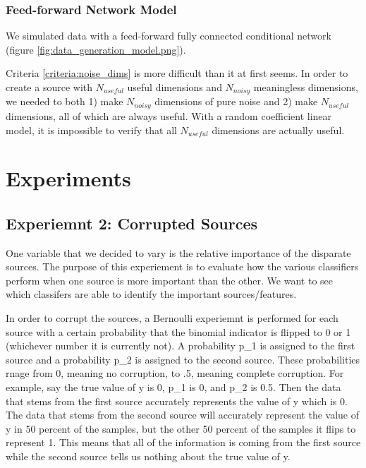 \documentclass{article}
\begin{document}
\subsubsection{Feed-forward Network Model}

We simulated data with a feed-forward fully connected conditional network
(figure \ref{fig:data_generation_model.png}).


Criteria \ref{criteria:noise_dims} is more difficult than it at first seems. In
order to create a source with $N_{useful}$ useful dimensions and $N_{noisy}$
meaningless dimensions, we needed to both 1) make $N_{noisy}$ dimensions of pure
noise and 2) make $N_{useful}$ dimensions, all of which are always useful. With a
random coefficient linear model, it is impossible to verify that all $N_{useful}$
dimensions are actually useful.


\section{Experiments}









\subsection{Experiemnt 2: Corrupted Sources}

One variable that we decided to vary is the relative importance of the disparate sources. The purpose of this experiement is to evaluate how the various classifiers perform when one source is more important than the other. We want to see which classifers are able to identify the important sources/features.

In order to corrupt the sources, a Bernoulli experiemnt is performed for each source with a certain probability that the binomial indicator is flipped to 0 or 1 (whichever number it is currently not). A probability p_1 is assigned to the first source and a probability p_2 is assigned to the second source. These probabilities rnage from 0, meaning no corruption, to .5, meaning complete corruption. For example, say the true value of y is 0, p_1 is 0, and p_2 is 0.5. Then the data that stems from the first source accurately represents the value of y which is 0. The data that stems from the second source will accurately represent the value of y in 50 percent of the samples, but the other 50 percent of the samples it flips to represent 1. This means that all of the information is coming from the first source while the second source tells us nothing about the true value of y.
\end{document}
